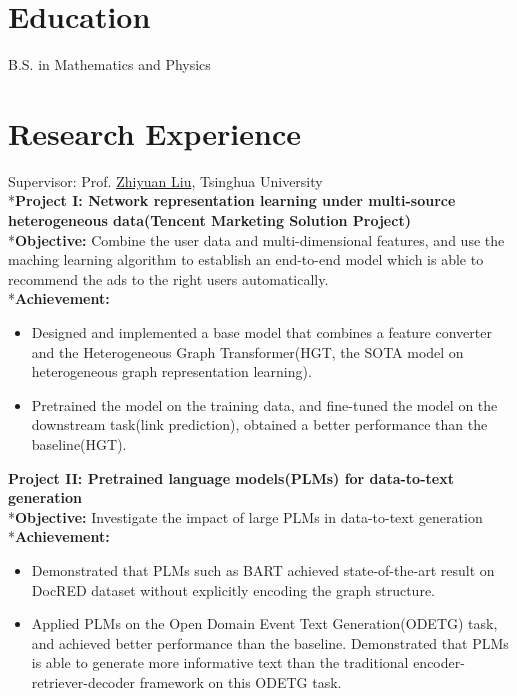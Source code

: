 \documentclass{resume}
\begin{document}



\section{Education}
B.S. in Mathematics and Physics


\section{Research Experience}
Supervisor: Prof. \href{http://nlp.csai.tsinghua.edu.cn/~lzy/}{Zhiyuan Liu}, Tsinghua University
\\*\textbf{Project I: Network representation learning under multi-source heterogeneous data(Tencent Marketing Solution Project)}
\\*\textbf{Objective:} Combine the user data and multi-dimensional features, and use the maching learning algorithm to establish an end-to-end model which is able to recommend the ads to the right users automatically. 
\\*\textbf{Achievement:}
\begin{itemize}
  \item Designed and implemented a base model that combines a feature converter and the Heterogeneous Graph Transformer(HGT, the SOTA model on heterogeneous graph representation learning). 
  \item Pretrained the model on the training data, and fine-tuned the model on the downstream task(link prediction), obtained a better performance than the baseline(HGT).
\end{itemize}

\textbf{Project II: Pretrained language models(PLMs) for data-to-text generation}
\\*\textbf{Objective:} Investigate the impact of large PLMs in data-to-text generation
\\*\textbf{Achievement:}
\begin{itemize}
  \item Demonstrated that PLMs such as BART achieved state-of-the-art result on DocRED dataset without explicitly encoding the graph structure.
  \item Applied PLMs on the Open Domain Event Text Generation(ODETG) task, and achieved better performance than the baseline. Demonstrated that PLMs is able to generate more informative text than the traditional encoder-retriever-decoder framework on this ODETG task.
\end{itemize}
\end{document}
